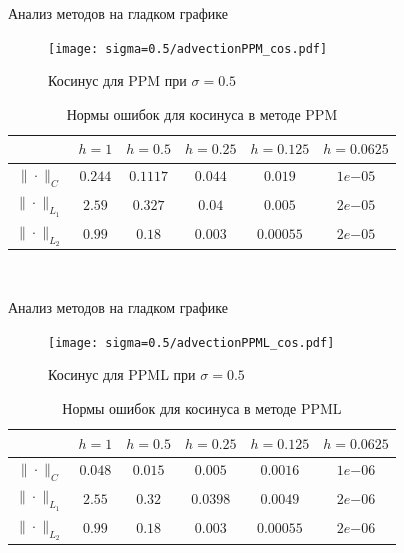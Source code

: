 \documentclass[unicode, 8pt]{beamer}
\begin{document}
    \begin{frame}{Анализ методов на гладком графике}
        \begin{figure}[h]
            \centering
            \texttt{[image: sigma=0.5/advectionPPM\_cos.pdf]}
            \caption{Косинус для PPM при $ \sigma = 0.5 $}
            \label{fig:ppm_cos_05}
        \end{figure}
        \begin{table}[h]
            \centering
            \begin{tabular}{ |c|c|c|c|c|c| } 
             \hline
             & $ h=1 $ &  $ h=0.5$ &  $ h=0.25 $ &  $ h=0.125 $ &  $ h=0.0625 $ \\ 
             \hline
             $\| \cdot \|_{C}$ & $0.244$ & $0.1117$ & $0.044$ & $0.019$ & $1e{-05}$
             \\
             \hline
             $\| \cdot \|_{L_1}$ & $2.59$ & $0.327$ & $0.04$ & $0.005$ & $2e{-05}$
             \\
             \hline
             $\| \cdot \|_{L_2}$ & $0.99$ & $0.18$ & $0.003$ & $0.00055$ & $2e{-05}$ 
             \\
             \hline
            \end{tabular}
            \\[0.1em]
            \caption{Нормы ошибок для косинуса в методе PPM}
            \label{table:cosPPM}
        \end{table}    
    \end{frame}

    \begin{frame}{Анализ методов на гладком графике}
        \begin{figure}[h]
            \centering
            \texttt{[image: sigma=0.5/advectionPPML\_cos.pdf]}
            \caption{Косинус для PPML при $ \sigma = 0.5 $}
            \label{fig:ppml_cos_05}
        \end{figure}
        \begin{table}[h]
            \centering
            \begin{tabular}{ |c|c|c|c|c|c| } 
             \hline
             & $ h=1 $ &  $ h=0.5$ &  $ h=0.25 $ &  $ h=0.125 $ &  $ h=0.0625 $ \\ 
             \hline
             $\| \cdot \|_{C}$ & $0.048$ & $0.015$ & $0.005$ & $0.0016$ & $1e{-06}$
             \\
             \hline
             $\| \cdot \|_{L_1}$ & $2.55$ & $0.32$ & $0.0398$ & $0.0049$ & $2e{-06}$
             \\
             \hline
             $\| \cdot \|_{L_2}$ & $0.99$ & $0.18$ & $0.003$ & $0.00055$ & $2e{-06}$ 
             \\
             \hline
            \end{tabular}
            \\[0.1em]
            \caption{Нормы ошибок для косинуса в методе PPML}
            \label{table:cosPPML}
         \end{table}
    \end{frame}
\end{document}
